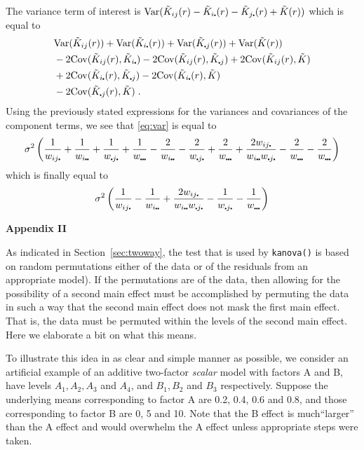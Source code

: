 \documentclass[12pt]{article}
\newcommand{\pullet}{\mbox{\scalebox{0.4}{$\bullet$}}}
\newcommand{\Cov}{\mbox{$\textup{\textrm{Cov}}$}}
\newcommand{\Var}{\mbox{$\textup{\textrm{Var}}$}}
\begin{document}
\newpage
The variance term of interest is $\Var(\tilde{K}_{ij}(r) -
\tilde{K}_{i\pullet}(r) - \tilde{K}_{j \pullet}(r) + \tilde{K}(r))$
which is equal to
\begin{equation}
\label{eq:var}
\begin{split}
& \Var(\tilde{K}_{ij}(r)) +
\Var(\tilde{K}_{i\pullet}(r)) +
\Var(\tilde{K}_{\pullet j}(r)) +
\Var(\tilde{K}(r)) \\
& -2 \Cov(\tilde{K}_{ij}(r),\tilde{K}_{i \pullet})
-2 \Cov(\tilde{K}_{ij}(r),\tilde{K}_{\pullet j}) +
2 \Cov(\tilde{K}_{ij}(r),\tilde{K}) \\ 
& +2 \Cov(\tilde{K}_{i \pullet}(r),\tilde{K}_{\pullet j}) -
2 \Cov(\tilde{K}_{i \pullet}(r),\tilde{K})\\
& - 2 \Cov(\tilde{K}_{\pullet j}(r),\tilde{K}) \; .
\end{split}
\end{equation}
Using the previously stated expressions for the variances and covariances
of the component terms, we see that \eqref{eq:var}
is equal to
\[
\sigma^2 \left (
\frac{1}{w_{i j \pullet}} +
\frac{1}{w_{i \pullet \pullet}} +
\frac{1}{w_{\pullet j \pullet}} +
\frac{1}{w_{\pullet \pullet \pullet}} -
\frac{2}{w_{i \pullet \pullet}} -
\frac{2}{w_{\pullet j \pullet}} +
\frac{2}{w_{\pullet \pullet \pullet}} +
\frac{2 w_{i j \pullet}}{w_{i \pullet \pullet} w_{\pullet j \pullet}} -
\frac{2}{w_{\pullet \pullet \pullet}} -
\frac{2}{w_{\pullet \pullet \pullet}}
\right )
\]
which is finally equal to
\[
\sigma^2 \left (
\frac{1}{w_{i j \pullet}} -
\frac{1}{w_{i \pullet \pullet}} +
\frac{2 w_{i j \pullet}}{w_{i \pullet \pullet} w_{\pullet j \pullet}} -
\frac{1}{w_{\pullet j \pullet}} -
\frac{1}{w_{\pullet \pullet \pullet}}
\right )
\]

\newpage
\begin{center}
{\LARGE \textbf{Appendix II}}
\end{center}

As indicated in Section~\ref{sec:twoway}, the test that is used by
\texttt{kanova()} is based on random permutations either of the data
or of the residuals from an appropriate model).  If the permutations
are of the data, then allowing for the possibility of a second main
effect must be accomplished by permuting the data in such a way
that the second main effect does not mask the first main effect.
That is, the data must be permuted within the levels of the second
main effect.  Here we elaborate a bit on what this means.

To illustrate this idea in as clear and simple manner as possible,
we consider an artificial example of an additive two-factor
\emph{scalar} model with factors A and B, have levels $A_1, A_2,
A_3$ and $A_4$, and $B_1, B_2$ and $B_3$ respectively.  Suppose the
underlying means corresponding to factor A are 0.2, 0.4, 0.6 and 0.8,
and those corresponding to factor B are 0, 5 and 10.  Note that the
B effect is much``larger'' than the A effect and would overwhelm
the A effect unless appropriate steps were taken.
\end{document}
